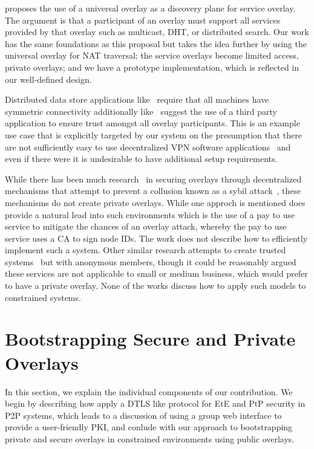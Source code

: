 \documentclass[conference]{IEEEtran}
\begin{document}
\cite{one_ring} proposes the use of a universal overlay as a discovery plane for
service overlay.  The argument is that a participant of an overlay
must support all services provided by that overlay such as multicast, DHT,
or distributed search.  Our work has the same foundations as this proposal but
takes the idea further by using the universal overlay for NAT traversal;
the service overlays become limited access, private overlays; and we have
a prototype implementation, which is reflected in our well-defined design.

Distributed data store applications like~\cite{dynamo, bigtable} require that
all machines have symmetric connectivity additionally like~\cite{past} suggest
the use of a third party application to ensure trust amongst all overlay
participants.  This is an example use case that is explicitly targeted by our
system on the presumption that there are not sufficiently easy to use
decentralized VPN software applications~\cite{sc09, nsdi10} and even if there
were it is undesirable to have additional setup requirements.

While there has been much research~\cite{secure_routing} in securing overlays
through decentralized mechanisms that attempt to prevent a collusion known as
a sybil attack~\cite{sybil}, these mechanisms do not create private overlays.
While one approch is mentioned does provide a natural lead into such
environments which is the use of a pay to use service to mitigate the chances
of an overlay attack, whereby the pay to use service uses a CA to sign node
IDs.  The work does not describe how to efficiently implement such a system.
Other similar research attempts to create trusted systems~\cite{stone, tor} but
with anonymous members, though it could be reasonably argued these services are
not applicable to small or medium business, which would prefer to have a private
overlay.  None of the works discuss how to apply such models to constrained
systems.

\section{Bootstrapping Secure and Private Overlays}
\label{contributions}
In this section, we explain the individual components of our contribution.  We
begin by describing how apply a DTLS like protocol for EtE and PtP security in
P2P systems, which leads to a discussion of using a group web interface to
provide a user-friendly PKI, and conlude with our approach to bootstrapping
private and secure overlays in constrained environments using public overlays.
\end{document}
